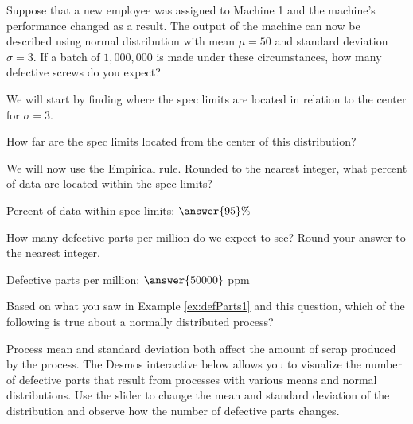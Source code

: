 \documentclass{ximera}
\begin{document}
\begin{question}\label{quest:defParts1}
    Suppose that a new employee was assigned to Machine 1 and the machine's performance changed as a result.   The output of the machine can now be described using normal distribution with mean $\mu=50$ and standard deviation $\sigma=3$.  If a batch of $1,000,000$ is made under these circumstances, how many defective screws do you expect?

    We will start by finding where the spec limits are located in relation to the center for $\sigma=3$.  
    
    How far are the spec limits located from the center of this distribution?

    \begin{multipleChoice}
    \end{multipleChoice}

    We will now use the Empirical rule.  Rounded to the nearest integer, what percent of data are located within the spec limits?

Percent of data within spec limits: $\answer{95}\%$

How many defective parts per million do we expect to see?  Round your answer to the nearest integer.

Defective parts per million: $\answer{50000}$ ppm

Based on what you saw in Example \ref{ex:defParts1} and this question, which of the following is true about a normally distributed process?

\begin{multipleChoice}
\end{multipleChoice}
    
\end{question}

Process mean and standard deviation both affect the amount of scrap produced by the process.  The Desmos interactive below allows you to visualize the number of defective parts that result from processes with various means and normal distributions.  Use the slider to change the mean and standard deviation of the distribution and observe how the number of defective parts changes.
\end{document}
